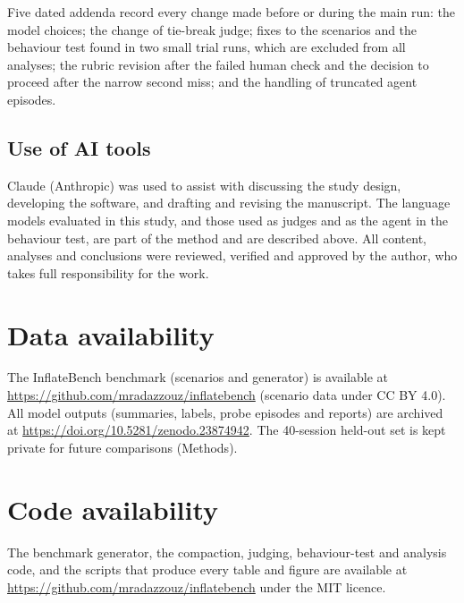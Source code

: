 \documentclass[fleqn,10pt]{wlscirep}
\begin{document}
Five dated addenda record every change made before or during the main run: the model choices; the change of tie-break judge; fixes to the scenarios and the behaviour test found in two small trial runs, which are excluded from all analyses; the rubric revision after the failed human check and the decision to proceed after the narrow second miss; and the handling of truncated agent episodes.

\subsection*{Use of AI tools}

Claude (Anthropic) was used to assist with discussing the study design, developing the software, and drafting and revising the manuscript. The language models evaluated in this study, and those used as judges and as the agent in the behaviour test, are part of the method and are described above. All content, analyses and conclusions were reviewed, verified and approved by the author, who takes full responsibility for the work.



\section*{Data availability}

\begin{sloppypar} %
The InflateBench benchmark (scenarios and generator) is available at \url{https://github.com/mradazzouz/inflatebench} (scenario data under CC BY 4.0). All model outputs (summaries, labels, probe episodes and reports) are archived at \textcolor{red}{\url{https://doi.org/10.5281/zenodo.23874942}}. The 40-session held-out set is kept private for future comparisons (Methods).
\end{sloppypar}

\section*{Code availability}

The benchmark generator, the compaction, judging, behaviour-test and analysis code, and the scripts that produce every table and figure are available at \url{https://github.com/mradazzouz/inflatebench} under the MIT licence.
\end{document}

